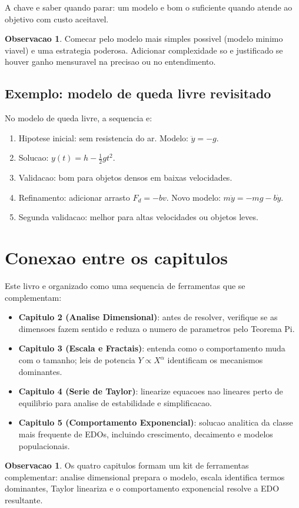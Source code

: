 \documentclass[12pt,a4paper,oneside]{book}
\theoremstyle{definition}
\newtheorem{remark}[definition]{Observacao}
\begin{document}
A chave e saber quando parar: um modelo e bom o suficiente quando atende ao objetivo com custo aceitavel.

\begin{remark}
Comecar pelo modelo mais simples possivel (modelo minimo viavel) e uma estrategia poderosa.
Adicionar complexidade so e justificado se houver ganho mensuravel na precisao ou no entendimento.
\end{remark}

\subsection{Exemplo: modelo de queda livre revisitado}

No modelo de queda livre, a sequencia e:
\begin{enumerate}
    \item Hipotese inicial: sem resistencia do ar. Modelo: $\ddot{y} = -g$.
    \item Solucao: $y(t) = h - \tfrac{1}{2}gt^2$.
    \item Validacao: bom para objetos densos em baixas velocidades.
    \item Refinamento: adicionar arrasto $F_d = -bv$. Novo modelo: $m\ddot{y} = -mg - b\dot{y}$.
    \item Segunda validacao: melhor para altas velocidades ou objetos leves.
\end{enumerate}

\section{Conexao entre os capitulos}

Este livro e organizado como uma sequencia de ferramentas que se complementam:

\begin{itemize}
    \item \textbf{Capitulo 2 (Analise Dimensional)}: antes de resolver, verifique se as dimensoes fazem sentido
          e reduza o numero de parametros pelo Teorema Pi.
    \item \textbf{Capitulo 3 (Escala e Fractais)}: entenda como o comportamento muda com o tamanho;
          leis de potencia $Y \propto X^\alpha$ identificam os mecanismos dominantes.
    \item \textbf{Capitulo 4 (Serie de Taylor)}: linearize equacoes nao lineares perto de equilibrio
          para analise de estabilidade e simplificacao.
    \item \textbf{Capitulo 5 (Comportamento Exponencial)}: solucao analitica da classe mais frequente
          de EDOs, incluindo crescimento, decaimento e modelos populacionais.
\end{itemize}

\begin{remark}
Os quatro capitulos formam um kit de ferramentas complementar: analise dimensional prepara o modelo,
escala identifica termos dominantes, Taylor lineariza e o comportamento exponencial resolve a EDO resultante.
\end{remark}
\end{document}
